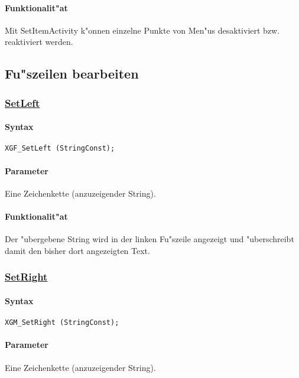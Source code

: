 \paragraph{Funktionalit"at}
Mit SetItemActivity k"onnen einzelne Punkte von Men"us desaktiviert bzw.
reaktiviert werden.


\subsection{Fu"szeilen bearbeiten\label{XGF}}


\subsubsection{\underline{SetLeft}}

\paragraph{Syntax}
\begin{verbatim}
XGF_SetLeft (StringConst);
\end{verbatim}

\paragraph{Parameter}
Eine Zeichenkette (anzuzeigender String).

\paragraph{Funktionalit"at}
Der "ubergebene String wird in der linken Fu"szeile angezeigt und
"uberschreibt damit den bisher dort angezeigten Text.


\subsubsection{\underline{SetRight}}

\paragraph{Syntax}
\begin{verbatim}
XGM_SetRight (StringConst);
\end{verbatim}

\paragraph{Parameter}
Eine Zeichenkette (anzuzeigender String).

